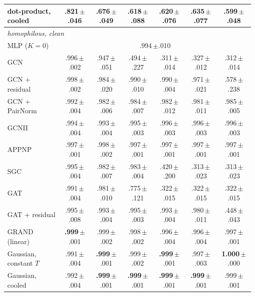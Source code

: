 \begin{tabular}{lcccccc}
dot-product, cooled & .821\,{\tiny$\pm$.046} & .676\,{\tiny$\pm$.049} & .618\,{\tiny$\pm$.088} & .620\,{\tiny$\pm$.076} & .635\,{\tiny$\pm$.077} & .599\,{\tiny$\pm$.048}\\
\midrule
\multicolumn{7}{l}{\emph{homophilous, clean}}\\
MLP ($K=0$) & \multicolumn{6}{c}{.994\,{\tiny$\pm$.010}}\\
GCN & .996\,{\tiny$\pm$.002} & .947\,{\tiny$\pm$.051} & .494\,{\tiny$\pm$.227} & .311\,{\tiny$\pm$.014} & .327\,{\tiny$\pm$.012} & .312\,{\tiny$\pm$.014}\\
GCN + residual & .998\,{\tiny$\pm$.002} & .984\,{\tiny$\pm$.020} & .990\,{\tiny$\pm$.010} & .990\,{\tiny$\pm$.004} & .971\,{\tiny$\pm$.021} & .578\,{\tiny$\pm$.238}\\
GCN + PairNorm & .992\,{\tiny$\pm$.004} & .982\,{\tiny$\pm$.006} & .984\,{\tiny$\pm$.007} & .982\,{\tiny$\pm$.012} & .981\,{\tiny$\pm$.011} & .985\,{\tiny$\pm$.005}\\
GCNII & .994\,{\tiny$\pm$.004} & .993\,{\tiny$\pm$.004} & .995\,{\tiny$\pm$.003} & .996\,{\tiny$\pm$.003} & .996\,{\tiny$\pm$.003} & .996\,{\tiny$\pm$.003}\\
APPNP & .997\,{\tiny$\pm$.001} & .998\,{\tiny$\pm$.002} & .997\,{\tiny$\pm$.001} & .997\,{\tiny$\pm$.001} & .997\,{\tiny$\pm$.001} & .997\,{\tiny$\pm$.001}\\
SGC & .995\,{\tiny$\pm$.004} & .982\,{\tiny$\pm$.007} & .983\,{\tiny$\pm$.004} & .420\,{\tiny$\pm$.200} & .313\,{\tiny$\pm$.023} & .313\,{\tiny$\pm$.023}\\
GAT & .991\,{\tiny$\pm$.004} & .981\,{\tiny$\pm$.010} & .775\,{\tiny$\pm$.121} & .322\,{\tiny$\pm$.015} & .322\,{\tiny$\pm$.015} & .322\,{\tiny$\pm$.015}\\
GAT + residual & .995\,{\tiny$\pm$.008} & .993\,{\tiny$\pm$.004} & .995\,{\tiny$\pm$.003} & .993\,{\tiny$\pm$.004} & .980\,{\tiny$\pm$.011} & .448\,{\tiny$\pm$.043}\\
GRAND (linear) & \textbf{.999}\,{\tiny$\pm$.001} & .999\,{\tiny$\pm$.002} & .998\,{\tiny$\pm$.002} & .996\,{\tiny$\pm$.004} & .996\,{\tiny$\pm$.004} & .997\,{\tiny$\pm$.001}\\
Gaussian, constant $T$ & .991\,{\tiny$\pm$.004} & \textbf{.999}\,{\tiny$\pm$.001} & .999\,{\tiny$\pm$.002} & \textbf{.999}\,{\tiny$\pm$.001} & .997\,{\tiny$\pm$.003} & \textbf{1.000}\,{\tiny$\pm$.000}\\
Gaussian, cooled & .992\,{\tiny$\pm$.004} & \textbf{.999}\,{\tiny$\pm$.001} & \textbf{.999}\,{\tiny$\pm$.001} & \textbf{.999}\,{\tiny$\pm$.001} & \textbf{.999}\,{\tiny$\pm$.001} & .999\,{\tiny$\pm$.001}\\

\end{tabular}
